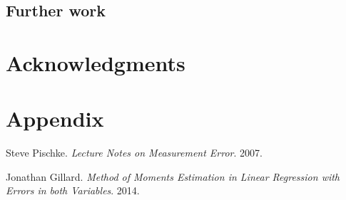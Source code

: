 \documentclass{article}
\begin{document}
\subsection{Further work}

\section{Acknowledgments}

\section{Appendix}

\begin{thebibliography}{9}

    Steve Pischke.
    \textit{Lecture Notes on Measurement Error}.
    2007.

    Jonathan Gillard.
    \textit{Method of Moments Estimation in Linear Regression with Errors in both Variables}.
    2014.

\end{thebibliography}
\end{document}
